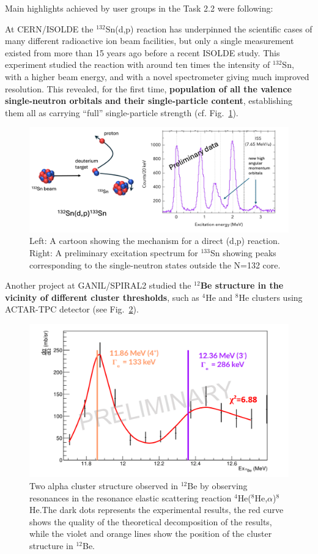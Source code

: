 Main highlights achieved by user groups in the Task 2.2 were following:

At CERN/ISOLDE the $^{132}$Sn(d,p) reaction has underpinned the scientific cases of many different radioactive ion beam facilities, but only a single measurement existed from more than 15 years ago before a recent ISOLDE study. This experiment studied the reaction with around ten times the intensity of $^{132}$Sn, with a higher beam energy, and with a novel spectrometer giving much improved resolution. This revealed, for the first time, \textbf{population of all the valence single-neutron orbitals and their single-particle content}, establishing them all as carrying “full” single-particle strength (cf. Fig.~\ref{fig:ISOLDE_Highlight_1}). 

\begin{figure}[!h]
    \centering
    \includegraphics[width=0.9\linewidth]{graphics/ISOLDE_highlight_1.png}
    \caption{Left: A cartoon showing the mechanism for a direct (d,p) reaction.
Right: A preliminary excitation spectrum for $^{133}$Sn showing peaks corresponding to the single-neutron states outside the N=132 core.
}
    \label{fig:ISOLDE_Highlight_1}
\end{figure}

Another project at GANIL/SPIRAL2 studied the \textbf{$^{12}$Be structure in the vicinity of different cluster thresholds}, such as $^4$He and $^8$He clusters using ACTAR-TPC detector (see Fig.~\ref{fig:2alpha_cluster}). 

\begin{figure}[!h]
    \centering
    \includegraphics[width=0.6\linewidth]{graphics/2alpha_cluster.png}
    \caption{Two alpha cluster structure observed in $^{12}$Be by observing resonances in the resonance elastic scattering reaction $^4$He($^8$He,$\alpha$)$^8$He.The dark dots represents the experimental results, the red curve shows the quality of the theoretical decomposition of the results, while the violet and orange lines show the position of the cluster structure in $^{12}$Be.
}
    \label{fig:2alpha_cluster}
\end{figure}

